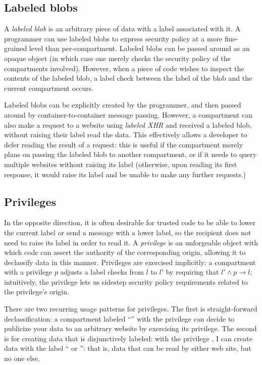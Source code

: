 \subsection{Labeled blobs}

A \emph{labeled blob} is an arbitrary piece of data with a label
associated with it.
%
A programmer can use labeled blobs to express security policy at
a more fine-grained level than per-compartment.
%
Labeled blobs can be passed around as an opaque object (in which case one merely
checks the security policy of the compartments involved).
%
However, when a piece of code wishes to inspect the contents of the
labeled blob, a label check between the label of the blob and the
current compartment occurs.

Labeled blobs can be explicitly created by the programmer, and then
passed around by container-to-container message passing.
%
However, a compartment can also make a request to a website using
\emph{labeled XHR} and received a labeled blob, without raising their
label read the data.
%
This effectively allows a developer to defer reading the result of
a request: this is useful if the compartment merely plans on passing
the labeled blob to another compartment, or if it needs to query
multiple websites without raising its label (otherwise, upon reading
its first response, it would raise its label and be unable to
make any further requests.)


\subsection{Privileges}

In the opposite direction, it is often desirable for trusted code to be
able to lower the current label or send a message with a lower label, so
the recipient does not need to raise its label in order to read it.
%
A \emph{privilege} is an unforgeable object with which code can assert
the authority of the corresponding origin, allowing it to declassify
data in this manner.
%
Privileges are exercised implicitly: a compartment with a privilege $p$
adjusts a label checks from $l$ to $l'$ by requiring that $l' \land p
\rightarrow l$; intuitively, the privilege lets us sidestep security
policy requirements related to the privilege's origin.

There are two recurring usage patterns for privileges.
%
The first is straight-forward declassification: a compartment labeled
``'' with the  privilege can decide
to publicize your data to an arbitrary website by exercising its
privilege.
%
The second is for creating data that is disjunctively labeled:
with the privilege , I can create data with
the label `` or '': that is,
data that can be read by either web site, but no one else.

